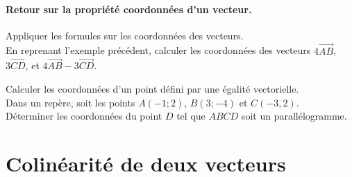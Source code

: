 \paragraph{Retour sur la propriété coordonnées d'un vecteur.}


\begin{Méthode}Appliquer les formules sur les coordonnées des vecteurs. \\
En reprenant l'exemple précédent, calculer les coordonnées des vecteurs $4\overrightarrow{AB}$, $3\overrightarrow{CD}$, et $4\overrightarrow{AB}-3\overrightarrow{CD}$. 
\vspace{0.2cm}

\ligne

\ligne

\ligne

\ligne

\ligne

\ligne

\end{Méthode}
\vspace{0.5cm}
\begin{Méthode}Calculer les coordonnées d'un point défini par une égalité vectorielle. \\
Dans un repère, soit les points $A(-1;2)$, $B(3;-4)$ et $C(-3,2)$.\\
Déterminer les coordonnées du point $D$ tel que $ABCD$ soit un parallélogramme. 
\vspace{0.2cm}

\ligne

\ligne

\ligne

\ligne

\ligne


\end{Méthode}

\vspace{0.5cm}

\section{Colinéarité de deux vecteurs}
